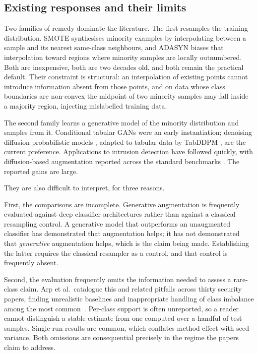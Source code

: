 \documentclass[11pt]{article}
\begin{document}
\subsection*{Existing responses and their limits}

Two families of remedy dominate the literature. The first resamples the training
distribution. SMOTE \cite{chawla2002smote} synthesises minority examples by
interpolating between a sample and its nearest same-class neighbours, and ADASYN
\cite{he2008adasyn} biases that interpolation toward regions where minority
samples are locally outnumbered. Both are inexpensive, both are two decades old,
and both remain the practical default. Their constraint is structural: an
interpolation of existing points cannot introduce information absent from those
points, and on data whose class boundaries are non-convex the midpoint of two
minority samples may fall inside a majority region, injecting mislabelled
training data.

The second family learns a generative model of the minority distribution and
samples from it. Conditional tabular GANs \cite{xu2019modeling} were an early
instantiation; denoising diffusion probabilistic models \cite{ho2020denoising},
adapted to tabular data by TabDDPM \cite{kotelnikov2023tabddpm}, are the current
preference. Applications to intrusion detection have followed quickly, with
diffusion-based augmentation reported across the standard benchmarks
\cite{yang2025diffids}. The reported gains are large.

They are also difficult to interpret, for three reasons.

First, the comparisons are incomplete. Generative augmentation is frequently evaluated against deep classifier architectures rather than against a classical resampling control. A generative model that
outperforms an unaugmented classifier has demonstrated that augmentation helps;
it has not demonstrated that \emph{generative} augmentation helps, which is the
claim being made. Establishing the latter requires the classical resampler as a
control, and that control is frequently absent.

Second, the evaluation frequently omits the information needed to assess a rare-class claim. Arp et al.\ catalogue this and related pitfalls across thirty security papers, finding unrealistic baselines and inappropriate handling of class imbalance among the most common~\cite{arp2022dos}. Per-class support is often unreported, so a reader cannot
distinguish a stable estimate from one computed over a handful of test samples.
Single-run results are common, which conflates method effect with seed variance.
Both omissions are consequential precisely in the regime the papers claim to
address.
\end{document}
